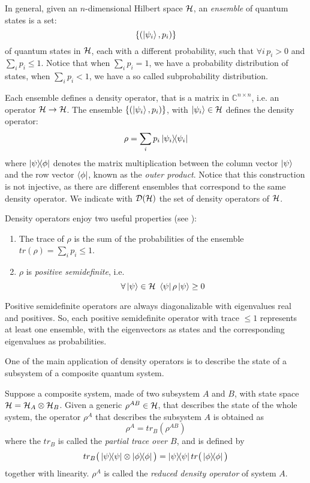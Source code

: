 In general, given an $n$-dimensional Hilbert space $\mathcal{H}$, an \textit{ensemble} of quantum states is a set:
\[\{(\ket{\psi_i}, p_i)\} \]
of quantum states in $\mathcal{H}$, each with a different probability, such that $\forall i \, p_i > 0$ and $\sum_i p_i \leq 1$. Notice that when $\sum_i p_i = 1$, we have a probability distribution of states, when $\sum_i p_i < 1$, we have a so called subprobability distribution.

Each ensemble defines a density operator, that is a matrix in $\mathbb{C}^{n \times n}$, i.e. an operator $\mathcal{H} \rightarrow \mathcal{H}$. The ensemble $\{(\ket{\psi_i}, p_i)\}$, with $\ket{\psi_i} \in \mathcal{H}$ defines the density operator: 
\[
	\rho = \sum_i p_i \ket{\psi_i}\!\!\bra{\psi_i}
\]
where $\ket{\psi}\!\!\bra{\phi}$ denotes the matrix multiplication between the column vector $\ket{\psi}$ and the row vector $\bra{\phi}$, known as the \textit{outer product}. Notice that this construction is not injective, as there are different ensembles that correspond to the same density operator. We indicate with $\mathcal{D}(\mathcal{H})$ the set of density operators of $\mathcal{H}$.

Density operators enjoy two useful properties (see \cite{nielsen_chuang_2010}): \begin{enumerate}
\item The trace of $\rho$ is the sum of the probabilities of the ensemble $tr(\rho) = \sum_i p_i \leq 1$.
\item $\rho$ is \textit{positive semidefinite}, i.e. 
\[\forall \ket{\psi} \in \mathcal{H} \ \bra{\psi}\rho\ket{\psi} \geq 0\]
\end{enumerate}

Positive semidefinite operators are always diagonalizable with eigenvalues real and positives. So, each positive semidefinite operator with trace $\leq 1$ represents at least one ensemble, with the eigenvectors as states and the corresponding eigenvalues as probabilities.


One of the main application of density operators is to describe the state of a subsystem of a composite quantum system.

Suppose a composite system, made of two subsystem $A$ and $B$, with state space  $\mathcal{H} = \mathcal{H}_A \otimes \mathcal{H}_B$.  Given a generic $\rho^{AB} \in \mathcal{H}$, that describes the state of the whole system, the operator $\rho^A$ that describes the subsystem $A$ is obtained as 
\[
	\rho^A = tr_B(\rho^{AB})
\]
where the $tr_B$ is called the \textit{partial trace over $B$}, and is defined by 
\[
 tr_B\big(\proj{\psi} \otimes \proj{\phi}\big) = \proj{\psi}tr\big(\proj{\phi}\big)
\]
together with linearity. $\rho^A$ is called the \textit{reduced density operator} of system $A$.

